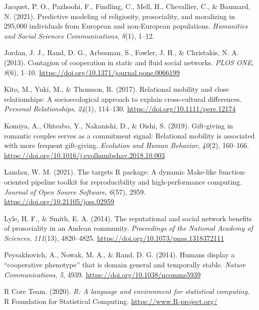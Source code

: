 \documentclass[
  man,floatsintext]{apa6}
\newlength{\cslhangindent}
\newlength{\cslentryspacingunit} %
\newenvironment{CSLReferences}[2] %
 {%
  \setlength{\parindent}{0pt}
  \ifodd #1
  \let\oldpar\par
  \def\par{\hangindent=\cslhangindent\oldpar}
  \fi
  \setlength{\parskip}{#2\cslentryspacingunit}
 }%
 {}
\begin{document}
\begin{CSLReferences}{1}{0}
\leavevmode{}%
Jacquet, P. O., Pazhoohi, F., Findling, C., Mell, H., Chevallier, C., \& Baumard, N. (2021). Predictive modeling of religiosity, prosociality, and moralizing in 295,000 individuals from {European} and {non-European} populations. \emph{Humanities and Social Sciences Communications}, \emph{8}(1), 1--12.

\leavevmode{}%
Jordan, J. J., Rand, D. G., Arbesman, S., Fowler, J. H., \& Christakis, N. A. (2013). Contagion of cooperation in static and fluid social networks. \emph{PLOS ONE}, \emph{8}(6), 1--10. \url{https://doi.org/10.1371/journal.pone.0066199}

\leavevmode{}%
Kito, M., Yuki, M., \& Thomson, R. (2017). Relational mobility and close relationships: A socioecological approach to explain cross-cultural differences. \emph{Personal Relationships}, \emph{24}(1), 114--130. \url{https://doi.org/10.1111/pere.12174}

\leavevmode{}%
Komiya, A., Ohtsubo, Y., Nakanishi, D., \& Oishi, S. (2019). Gift-giving in romantic couples serves as a commitment signal: Relational mobility is associated with more frequent gift-giving. \emph{Evolution and Human Behavior}, \emph{40}(2), 160--166. \url{https://doi.org/10.1016/j.evolhumbehav.2018.10.003}

\leavevmode{}%
Landau, W. M. (2021). The targets {R} package: A dynamic {Make}-like function-oriented pipeline toolkit for reproducibility and high-performance computing. \emph{Journal of Open Source Software}, \emph{6}(57), 2959. \url{https://doi.org/10.21105/joss.02959}

\leavevmode{}%
Lyle, H. F., \& Smith, E. A. (2014). The reputational and social network benefits of prosociality in an {A}ndean community. \emph{Proceedings of the National Academy of Sciences}, \emph{111}(13), 4820--4825. \url{https://doi.org/10.1073/pnas.1318372111}

\leavevmode{}%
Peysakhovich, A., Nowak, M. A., \& Rand, D. G. (2014). Humans display a {``cooperative phenotype''} that is domain general and temporally stable. \emph{Nature Communications}, \emph{5}, 4939. \url{https://doi.org/10.1038/ncomms5939}

\leavevmode{}%
R Core Team. (2020). \emph{R: A language and environment for statistical computing}. R Foundation for Statistical Computing. \url{https://www.R-project.org/}


\end{CSLReferences}
\end{document}
